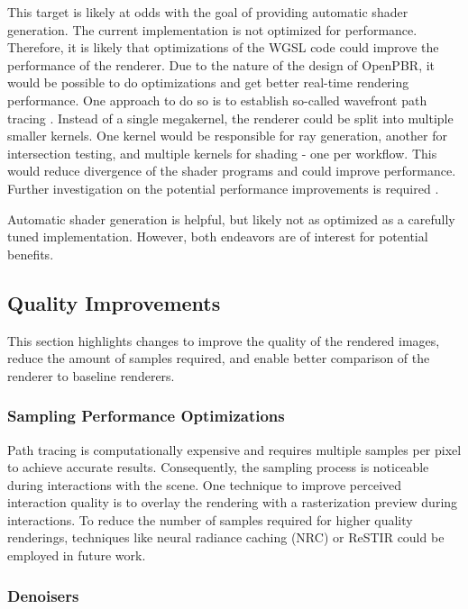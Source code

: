 This target is likely at odds with the goal of providing automatic shader generation. The current implementation is not optimized for performance. Therefore, it is likely that optimizations of the \gls{WGSL} code could improve the performance of the renderer. Due to the nature of the design of \gls{OpenPBR}, it would be possible to do optimizations and get better real-time rendering performance. One approach to do so is to establish so-called wavefront path tracing \cite{laine2013megakernels}. Instead of a single megakernel, the renderer could be split into multiple smaller kernels. One kernel would be responsible for ray generation, another for intersection testing, and multiple kernels for shading - one per workflow. This would reduce divergence of the shader programs and could improve performance. Further investigation on the potential performance improvements is required \cite{wavefrontComparisonInTableA5,mitsubaWavefrontVsMegakernel}.

Automatic shader generation is helpful, but likely not as optimized as a carefully tuned implementation. However, both endeavors are of interest for potential benefits.

\subsection*{Quality Improvements}

This section highlights changes to improve the quality of the rendered images, reduce the amount of samples required, and enable better comparison of the renderer to baseline renderers.

\subsubsection*{Sampling Performance Optimizations}

Path tracing is computationally expensive and requires multiple samples per pixel to achieve accurate results. Consequently, the sampling process is noticeable during interactions with the scene. One technique to improve perceived interaction quality is to overlay the rendering with a rasterization preview during interactions. To reduce the number of samples required for higher quality renderings, techniques like neural radiance caching (NRC) \cite{muller2021real} or \gls{ReSTIR} \cite{restir} could be employed in future work.

\subsubsection*{Denoisers}

